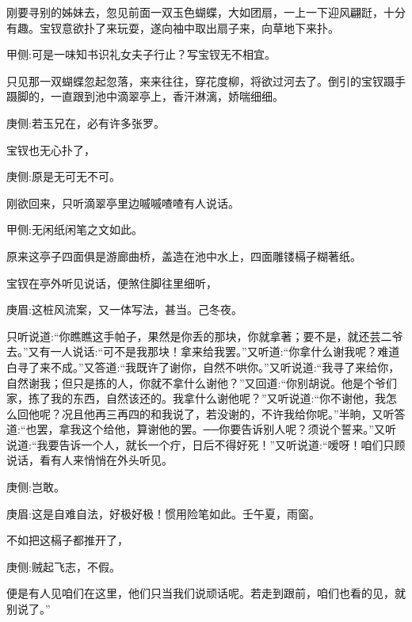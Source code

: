 \begin{parag}
    刚要寻别的姊妹去，忽见前面一双玉色蝴蝶，大如团扇，一上一下迎风翩跹，十分有趣。宝钗意欲扑了来玩耍，遂向袖中取出扇子来，向草地下来扑。\begin{note}甲侧:可是一味知书识礼女夫子行止？写宝钗无不相宜。\end{note}只见那一双蝴蝶忽起忽落，来来往往，穿花度柳，将欲过河去了。倒引的宝钗蹑手蹑脚的，一直跟到池中滴翠亭上，香汗淋漓，娇喘细细。\begin{note}庚侧:若玉兄在，必有许多张罗。\end{note}宝钗也无心扑了，\begin{note}庚侧:原是无可无不可。\end{note}刚欲回来，只听滴翠亭里边嘁嘁喳喳有人说话。\begin{note}甲侧:无闲纸闲笔之文如此。\end{note}原来这亭子四面俱是游廊曲桥，盖造在池中水上，四面雕镂槅子糊著纸。
\end{parag}


\begin{parag}
    宝钗在亭外听见说话，便煞住脚往里细听，\begin{note}庚眉:这桩风流案，又一体写法，甚当。己冬夜。\end{note}只听说道:“你瞧瞧这手帕子，果然是你丢的那块，你就拿著；要不是，就还芸二爷去。”又有一人说话:“可不是我那块！拿来给我罢。”又听道:“你拿什么谢我呢？难道白寻了来不成。”又答道:“我既许了谢你，自然不哄你。”又听说道:“我寻了来给你，自然谢我；但只是拣的人，你就不拿什么谢他？”又回道:“你别胡说。他是个爷们家，拣了我的东西，自然该还的。我拿什么谢他呢？”又听说道:“你不谢他，我怎么回他呢？况且他再三再四的和我说了，若没谢的，不许我给你呢。”半晌，又听答道:“也罢，拿我这个给他，算谢他的罢。──你要告诉别人呢？须说个誓来。”又听说道:“我要告诉一个人，就长一个疔，日后不得好死！”又听说道:“嗳呀！咱们只顾说话，看有人来悄悄在外头听见。\begin{note}庚侧:岂敢。\end{note}\begin{note}庚眉:这是自难自法，好极好极！惯用险笔如此。壬午夏，雨窗。\end{note}不如把这槅子都推开了，\begin{note}庚侧:贼起飞志，不假。\end{note}便是有人见咱们在这里，他们只当我们说顽话呢。若走到跟前，咱们也看的见，就别说了。”
\end{parag}


